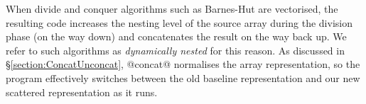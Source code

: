 When divide and conquer algorithms such as \mbox{Barnes-Hut} are vectorised, the resulting code increases the nesting level of the source array during the division phase (on the way down) and concatenates the result on the way back up. We refer to such algorithms as \emph{dynamically nested} for this reason. As discussed in \S\ref{section:ConcatUnconcat}, @concat@ normalises the array representation, so the program effectively switches between the old baseline representation and our new scattered representation as it runs.
